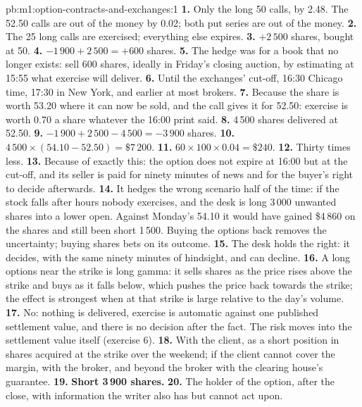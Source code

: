 \begin{solution}{pb:m1:option-contracts-and-exchanges:1}
\textbf{1.} Only the long 50 calls, by 2.48. The 52.50 calls are out of the
money by 0.02; both put series are out of the money.
\textbf{2.} The 25 long calls are exercised; everything else expires.
\textbf{3.} $+2\,500$ shares, bought at 50.
\textbf{4.} $-1\,900 + 2\,500 = +600$ shares.
\textbf{5.} The hedge was for a book that no longer exists: sell 600 shares,
ideally in Friday's closing auction, by estimating at 15:55 what exercise
will deliver.
\textbf{6.} Until the exchanges' cut-off, 16:30 Chicago time, 17:30 in New
York, and earlier at most brokers.
\textbf{7.} Because the share is worth 53.20 where it can now be sold, and
the call gives it for 52.50: exercise is worth 0.70 a share whatever the
16:00 print said.
\textbf{8.} 4\,500 shares delivered at 52.50.
\textbf{9.} $-1\,900 + 2\,500 - 4\,500 = -3\,900$ shares.
\textbf{10.} $4\,500 \times (54.10 - 52.50) = \$7\,200$.
\textbf{11.} $60 \times 100 \times 0.04 = \$240$.
\textbf{12.} Thirty times less.
\textbf{13.} Because of exactly this: the option does not expire at 16:00
but at the cut-off, and its seller is paid for ninety minutes of news and for
the buyer's right to decide afterwards.
\textbf{14.} It hedges the wrong scenario half of the time: if the stock
falls after hours nobody exercises, and the desk is long 3\,000 unwanted
shares into a lower open. Against Monday's 54.10 it would have gained
\$4\,860 on the shares and still been short 1\,500. Buying the options back
removes the uncertainty; buying shares bets on its outcome.
\textbf{15.} The desk holds the right: it decides, with the same ninety
minutes of hindsight, and can decline.
\textbf{16.} A  long options near the strike is long gamma: it
sells shares as the price rises above the strike and buys as it falls below,
which pushes the price back towards the strike; the effect is strongest when
 at that strike is large relative to the day's volume.
\textbf{17.} No: nothing is delivered, exercise is automatic against one
published settlement value, and there is no decision after the fact. The
risk moves into the settlement value itself (exercise 6).
\textbf{18.} With the client, as a short position in shares acquired at the
strike over the weekend; if the client cannot cover the margin, with the
broker, and beyond the broker with the clearing house's guarantee.
\textbf{19.} \textbf{Short 3\,900 shares.}
\textbf{20.} The holder of the option, after the close, with information the
writer also has but cannot act upon.
\end{solution}

